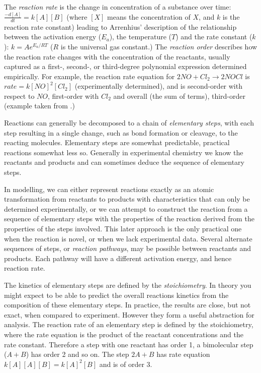 The \textit{reaction rate} is the change in concentration of a substance over time: \(\frac{-d[A]}{dt} = k[A][B]\) (where \([X]\) means the concentration of \(X\), and \(k\) is the reaction rate constant) leading to Arrenhius' description of the relationship between the activation energy (\(E_a\)), the temperature (\(T\)) and the rate constant (\(k\)): \(k = Ae^{E_a/RT}\) ($R$ is the universal gas constant.) The \textit{reaction order} describes how the reaction rate changes with the concentration of the reactants, usually captured as a first-, second-, or third-degree polynomial expression determined empirically. For example, the reaction rate equation for \(2NO + Cl_2 \rightarrow 2NOCl\) is \(rate = k[NO]^2[Cl_2]\) (experimentally determined), and is second-order with respect to \(NO\), first-order with \(Cl_2\) and overall (the sum of terms), third-order (example taken from \textcite{Kotz2006}.)

Reactions can generally be decomposed to a chain of \emph{elementary steps}, with each step resulting in a single change, such as bond formation or cleavage, to the reacting molecules. Elementary steps are somewhat predictable, practical reactions somewhat less so. Generally in experimental chemistry we know the reactants and products and can sometimes deduce the sequence of elementary steps.

In modelling, we can either represent reactions exactly as an atomic transformation from reactants to products with characteristics that can only be determined experimentally, or we can attempt to construct the reaction from a sequence of elementary steps with the properties of the reaction derived from the properties of the steps involved. This later approach is the only practical one when the reaction is novel, or when we lack experimental data. Several alternate sequences of steps, or \textit{reaction pathways}, may be possible between reactants and products. Each pathway will have a different activation energy, and hence reaction rate.

The kinetics of elementary steps are defined by the \emph{stoichiometry}. In theory you might expect to be able to predict the overall reactions kinetics from the composition of these elementary steps. In practice, the results are close, but not exact, when compared to experiment. However they form a useful abstraction for analysis. The reaction rate of an elementary step is defined by the stoichiometry, where the rate equation is the product of the reactant concentrations and the rate constant. Therefore a step with one reactant has order 1, a bimolecular step (\(A + B\)) has order 2 and so on. The step \(2A + B\) has rate equation \(k[A][A][B] = k[A]^2[B]\) and is of order 3. 

